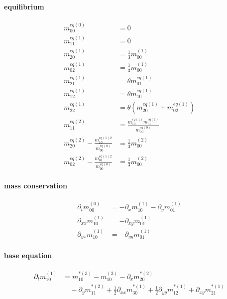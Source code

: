 \documentclass{article}
\begin{document}
  \paragraph{equilibrium}
  \begin{align}
    m_{00}^{eq(0)} & = 0 \label{Q1}\tag{Q1} \\
    m_{11}^{eq(1)} & = 0 \label{Q2}\tag{Q2} \\
    m_{20}^{eq(1)} & = \frac{1}{3} m_{00}^{(1)} \label{Q3}\tag{Q3} \\
    m_{02}^{eq(1)} & = \frac{1}{3} m_{00}^{(1)}  \label{Q4}\tag{Q4} \\
    m_{21}^{eq(1)} & = \theta m_{01}^{eq(1)} \label{Q5}\tag{Q5} \\
    m_{12}^{eq(1)} & = \theta m_{10}^{eq(1)} \label{Q6}\tag{Q6} \\
    m_{22}^{eq(1)} & = \theta (m_{20}^{eq(1)} + m_{02}^{eq(1)}) \label{Q7}\tag{Q7} \\
    m_{11}^{eq(2)} & = \frac{ m_{10}^{eq(1)}m_{01}^{eq(1)}}{m_{00}^{eq(0)}} \label{Q8}\tag{Q8} \\
    m_{20}^{eq(2)} - \frac{ m_{10}^{eq(1)2}}{m_{00}^{eq(0)}} & = \frac{1}{3} m_{00}^{(2)} \label{Q9}\tag{Q9} \\
    m_{02}^{eq(2)} - \frac{ m_{01}^{eq(1)2}}{m_{00}^{eq(0)}} & = \frac{1}{3} m_{00}^{(2)} \label{Q10}\tag{Q10}
  \end{align}

  \paragraph{mass conservation}
  \begin{align}
    \partial_t m_{00}^{(0)}  & =  - \partial_x m_{10}^{(1)} - \partial_y m_{01}^{(1)}\label{M1}\tag{M1} \\
    \partial_{xx} m_{10}^{(1)}  & = - \partial_{xy} m_{01}^{(1)} \label{M2}\tag{M2}\\
    \partial_{yx} m_{10}^{(1)}  & = - \partial_{yy} m_{01}^{(1)} \label{M3}\tag{M3}
  \end{align}

  \paragraph{base equation}
  \begin{equation}
    \label{B1}\tag{B1}
    \begin{aligned}
       \partial_t m_{10}^{(1)} & =
      m_{10}^{*(3)} - m_{10}^{(3)} - \partial_x m_{20}^{*(2)} \\
      &\quad - \partial_y m_{11}^{*(2)} + \frac{1}{2}\partial_{xx} m_{30}^{*(1)} + \frac{1}{2} \partial_{yy} m_{12}^{*(1)} + \partial_{xy} m_{21}^{*(1)}
    \end{aligned}
  \end{equation}
\end{document}
